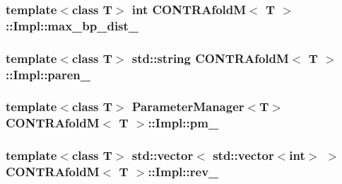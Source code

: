 \hypertarget{struct_c_o_n_t_r_afold_m_1_1_impl_a9bf98e3520a857cc2f74c4c498c15f94}{
\subsubsection[{max\+\_\+bp\+\_\+dist\+\_\+}]{\setlength{\rightskip}{0pt plus 5cm}template$<$class T$>$ int {\bf C\+O\+N\+T\+R\+Afold\+M}$<$ T $>$\+::Impl\+::max\+\_\+bp\+\_\+dist\+\_\+}}\label{struct_c_o_n_t_r_afold_m_1_1_impl_a9bf98e3520a857cc2f74c4c498c15f94}
\hypertarget{struct_c_o_n_t_r_afold_m_1_1_impl_ad7f267d1860e0ccdeb4f5f269f1672c6}{
\subsubsection[{paren\+\_\+}]{\setlength{\rightskip}{0pt plus 5cm}template$<$class T$>$ std\+::string {\bf C\+O\+N\+T\+R\+Afold\+M}$<$ T $>$\+::Impl\+::paren\+\_\+}}\label{struct_c_o_n_t_r_afold_m_1_1_impl_ad7f267d1860e0ccdeb4f5f269f1672c6}
\hypertarget{struct_c_o_n_t_r_afold_m_1_1_impl_a60c3b1fda2951015e561097906d52032}{
\subsubsection[{pm\+\_\+}]{\setlength{\rightskip}{0pt plus 5cm}template$<$class T$>$ {\bf Parameter\+Manager}$<$T$>$ {\bf C\+O\+N\+T\+R\+Afold\+M}$<$ T $>$\+::Impl\+::pm\+\_\+}}\label{struct_c_o_n_t_r_afold_m_1_1_impl_a60c3b1fda2951015e561097906d52032}
\hypertarget{struct_c_o_n_t_r_afold_m_1_1_impl_a01416d1629455fa35c6c215f271b49de}{
\subsubsection[{rev\+\_\+}]{\setlength{\rightskip}{0pt plus 5cm}template$<$class T$>$ std\+::vector$<$ std\+::vector$<$int$>$ $>$ {\bf C\+O\+N\+T\+R\+Afold\+M}$<$ T $>$\+::Impl\+::rev\+\_\+}}\label{struct_c_o_n_t_r_afold_m_1_1_impl_a01416d1629455fa35c6c215f271b49de}
